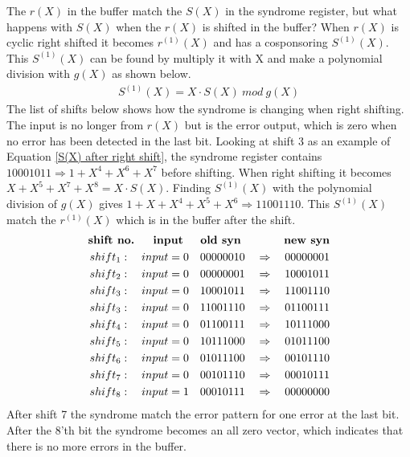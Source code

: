 \documentclass[Main]{subfiles}
\begin{document}
The $r(X)$ in the buffer match the $S(X)$ in the syndrome register, but what happens with $S(X)$ when the $r(X)$ is shifted in the buffer?
When $r(X)$ is cyclic right shifted it becomes $r^{(1)}(X)$ and has a cosponsoring $S^{(1)}(X)$.
This $S^{(1)}(X)$ can be found by multiply it with X and make a polynomial division with $g(X)$ as shown below.
\begin{eqnarray}
\label{S(X) after right shift}
S^{(1)}(X) = X \cdot S(X) \: mod \: g(X)
\end{eqnarray} 
The list of shifts below shows how the syndrome is changing when right shifting.
The input is no longer from $r(X)$ but is the error output, which is zero when no error has been detected in the last bit. 
Looking at shift 3 as an example of Equation \ref{S(X) after right shift}, the syndrome register contains $10001011 \Rightarrow 1+X^4+X^6+X^7$ before shifting.
When right shifting it becomes $X+X^5+X^7+X^8 = X \cdot S(X)$.
Finding $S^{(1)}(X)$ with the polynomial division of $g(X)$ gives $1+X+X^4+X^5+X^6 \Rightarrow 11001110$.
This $S^{(1)}(X)$ match the $r^{(1)}(X)$ which is in the buffer after the shift.
\begin{eqnarray*}
\textbf{shift no. \quad	input \quad old syn \qquad \quad new syn}\\
shift_1: \quad input = 0 \quad 00000010 \quad \Rightarrow \quad 00000001\\
shift_2: \quad input = 0 \quad 00000001 \quad \Rightarrow \quad 10001011\\
shift_3: \quad input = 0 \quad 10001011 \quad \Rightarrow \quad 11001110\\
shift_3: \quad input = 0 \quad 11001110 \quad \Rightarrow \quad 01100111\\
shift_4: \quad input = 0 \quad 01100111 \quad \Rightarrow \quad 10111000\\
shift_5: \quad input = 0 \quad 10111000 \quad \Rightarrow \quad 01011100\\
shift_6: \quad input = 0 \quad 01011100 \quad \Rightarrow \quad 00101110\\
shift_7: \quad input = 0 \quad 00101110 \quad \Rightarrow \quad 00010111\\
shift_8: \quad input = 1 \quad 00010111 \quad \Rightarrow \quad 00000000
\end{eqnarray*}
After shift 7 the syndrome match the error pattern for one error at the last bit.
After the 8'th bit the syndrome becomes an all zero vector, which indicates that there is no more errors in the buffer.
\end{document}
